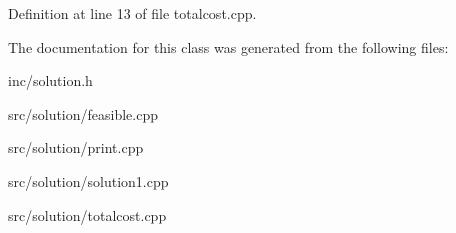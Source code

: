 Definition at line 13 of file totalcost.\+cpp.



The documentation for this class was generated from the following files\+:\begin{DoxyCompactItemize}
\item 
inc/solution.\+h\item 
src/solution/feasible.\+cpp\item 
src/solution/print.\+cpp\item 
src/solution/solution1.\+cpp\item 
src/solution/totalcost.\+cpp\end{DoxyCompactItemize}
